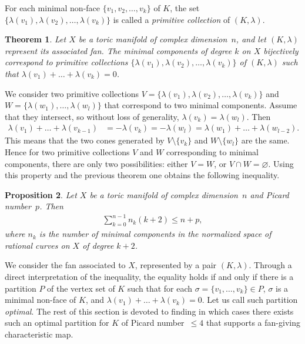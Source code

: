 \documentclass[11pt]{amsart}
\theoremstyle{plain}
\newtheorem{theorem}{Theorem}[section]
\newtheorem{proposition}[theorem]{Proposition}
\numberwithin{equation}{section}
\theoremstyle{definition}
\begin{document}
For each minimal non-face $\{v_1, v_2, \ldots, v_k\}$ of $K$, the set $\{\lambda(v_1), \lambda(v_2), \ldots, \lambda(v_k)\}$ is called a \emph{primitive collection} of $(K, \lambda)$.

\begin{theorem}{{\cite[Proposition~3.2]{fu2014minimal}}}
	Let $X$ be a toric manifold of complex dimension~$n$, and let $(K,\lambda)$ represent its associated fan.
    The minimal components of degree $k$ on $X$ bijectively correspond to primitive collections $\{\lambda(v_1), \lambda(v_2), \ldots, \lambda(v_k)\}$ of $(K, \lambda)$ such that $\lambda(v_1) + \dots + \lambda(v_k) = 0$.
\end{theorem}

We consider two primitive collections $V = \{\lambda(v_1), \lambda(v_2), \ldots, \lambda(v_k)\}$ and $W = \{\lambda(w_1),\ldots, \lambda(w_l)\}$ that correspond to two minimal components.
Assume that they intersect, so without loss of generality, $\lambda(v_k) = \lambda(w_l)$.
Then \begin{align*}
	\lambda(v_1) + \dots + \lambda(v_{k-1}) &= -\lambda(v_k)
	= -\lambda(w_l)
	= \lambda(w_1) + \dots + \lambda(w_{l-2}).
\end{align*}
This means that the two cones generated by $V \setminus \{v_k \}$ and $W \setminus \{w_l \}$ are the same.
Hence for two primitive collections $V$ and $W$ corresponding to minimal components, there are only two possibilities: either $V=W$, or $V \cap W = \varnothing$.
Using this property and the previous theorem one obtains the following inequality.
\begin{proposition}{{\cite[Proposition~3.5]{fu2014minimal}}}\label{proposition:inequality}
	Let $X$ be a toric manifold of complex dimension~$n$ and Picard number~$p$.
	Then \begin{align*}
		\sum_{k=0}^{n-1} n_k(k+2) \leq n+p,
	\end{align*}
	where $n_k$ is the number of minimal components in the normalized space of rational curves on $X$ of degree $k+2$.
\end{proposition}

We consider the fan associated to $X$, represented by a pair $(K, \lambda)$.
Through a direct interpretation of the inequality, the equality holds if and only if there is a partition $P$ of the vertex set of $K$ such that for each $\sigma = \{v_1, \ldots, v_k\} \in P$, $\sigma$ is a minimal non-face of $K$, and $\lambda(v_1) + \dots + \lambda(v_k) = 0$.
Let us call such partition \emph{optimal}.
The rest of this section is devoted to finding in which cases there exists such an optimal partition for $K$ of Picard number~$\leq 4$ that supports a fan-giving characteristic map.
\end{document}
